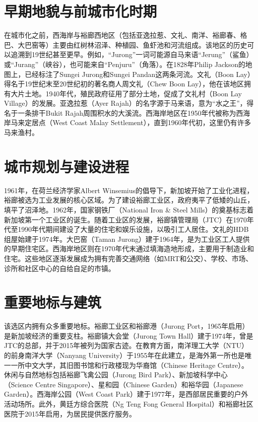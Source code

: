 \documentclass[11pt,a4paper,twoside,openany]{book}
\begin{document}
\section{早期地貌与前城市化时期}
在城市化之前，西海岸与裕廊西地区（包括亚逸拉惹、文礼、南洋、裕廊春、格巴、大巴窑等）主要由红树林沼泽、种植园、鱼虾池和河流组成。该地区的历史可以追溯到19世纪甚至更早。例如，“Jurong”一词可能源自马来语“Jerung”（鲨鱼）或“Jurang”（峡谷），也可能来自“Penjuru”（角落）。在1828年Philip Jackson的地图上，已经标注了Sungei Jurong和Sungei Pandan这两条河流。文礼（Boon Lay）得名于19世纪末至20世纪初的著名商人周文礼（Chew Boon Lay），他在该地区拥有大片土地。1940年代，殖民政府征用了部分土地，促成了文礼村（Boon Lay Village）的发展。亚逸拉惹（Ayer Rajah）的名字源于马来语，意为“水之王”，得名于一条排干Bukit Rajah周围积水的大溪流。西海岸地区在1950年代被称为西海岸马来定居点（West Coast Malay Settlement），直到1960年代初，这里仍有许多马来渔村。

\section{城市规划与建设进程}
1961年，在荷兰经济学家Albert Winsemius的倡导下，新加坡开始了工业化进程，裕廊被选为工业发展的核心区域。为了建设裕廊工业区，政府夷平了低矮的山丘，填平了沼泽地。1962年，国家钢铁厂（National Iron \& Steel Mills）的奠基标志着新加坡第一个工业区的诞生。随着工业区的发展，裕廊镇管理局（JTC）在1970年代至1990年代期间建设了大量的住宅和娱乐设施，以吸引工人居住。文礼的HDB组屋始建于1974年。大巴窑（Taman Jurong）建于1964年，是为工业区工人提供的早期住宅区。西海岸地区则在1970年代末通过填海造地形成，主要用于制造业和住宅。这些地区逐渐发展成为拥有完善交通网络（如MRT和公交）、学校、市场、诊所和社区中心的自给自足的市镇。

\section{重要地标与建筑}
该选区内拥有众多重要地标。裕廊工业区和裕廊港（Jurong Port，1965年启用）是新加坡经济的重要支柱。裕廊镇大会堂（Jurong Town Hall）建于1974年，曾是JTC的总部，并于2015年被列为国家古迹。在教育方面，南洋理工大学（NTU）的前身南洋大学（Nanyang University）于1955年在此建立，是海外第一所也是唯一一所中文大学，其旧图书馆和行政楼现为华裔馆（Chinese Heritage Centre）。休闲与自然地标包括裕廊飞禽公园（Jurong Bird Park）、新加坡科学中心（Science Centre Singapore）、星和园（Chinese Garden）和裕华园（Japanese Garden）。西海岸公园（West Coast Park）建于1977年，是西部居民重要的户外活动场所。此外，黄廷方综合医院（Ng Teng Fong General Hospital）和裕廊社区医院于2015年启用，为居民提供医疗服务。
\end{document}
